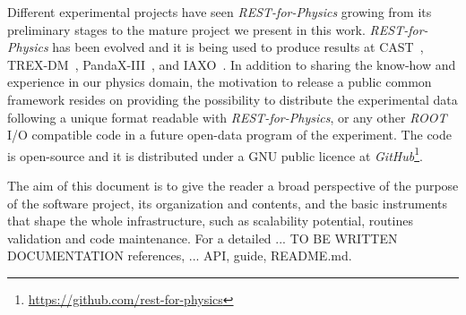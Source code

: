 Different experimental projects have seen \emph{REST-for-Physics} growing from its preliminary stages to the mature project we present in this work. \emph{REST-for-Physics} has been evolved and it is being used to produce results at CAST~\cite{Anastassopoulos:2017ftl}, TREX-DM~\cite{trexdm_bckmodel}, PandaX-III~\cite{pandaxiii_cdr,Lin:2018mpd,Galan:2019ake}, and IAXO~\cite{Armengaud:2019uso}. In addition to sharing the know-how and experience in our physics domain, the motivation to release a public common framework resides on providing the possibility to distribute the experimental data following a unique format readable with \emph{REST-for-Physics}, or any other \emph{ROOT} I/O compatible code in a future open-data program of the experiment. The code is open-source and it is distributed under a GNU public licence at \emph{GitHub}\footnote{\url{https://github.com/rest-for-physics}}.

The aim of this document is to give the reader a broad perspective of the purpose of the software project, its organization and contents, and the basic instruments that shape the whole infrastructure, such as scalability potential, routines validation and code maintenance. For a detailed ... TO BE WRITTEN DOCUMENTATION references, ... API, guide, README.md.





